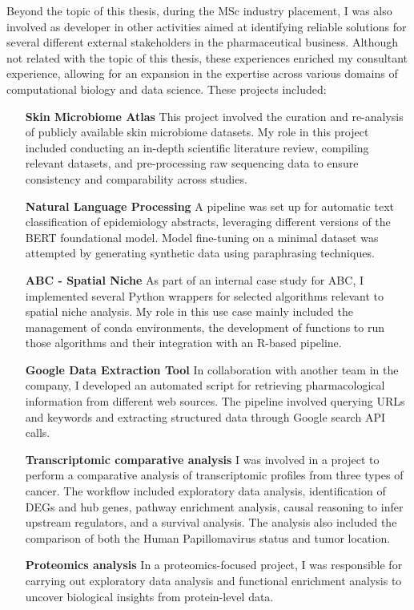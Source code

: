 Beyond the topic of this thesis, during the MSc industry placement, I was also involved as developer in other activities aimed at identifying reliable solutions for several different external stakeholders in the pharmaceutical business. Although not related with the topic of this thesis, these experiences enriched my consultant experience, allowing for an expansion in the expertise across various domains of computational biology and data science. 
These projects included:

\begin{enumerate}
\item[\textbf{Skin Microbiome Atlas}] This project involved the curation and re-analysis of publicly available skin microbiome datasets. My role in this project included conducting an in-depth scientific literature review, compiling relevant datasets, and pre-processing raw sequencing data to ensure consistency and comparability across studies. 
\item[\textbf{Natural Language Processing}] A pipeline was set up for automatic text classification of epidemiology abstracts, leveraging different versions of the BERT foundational model. Model fine-tuning on a minimal dataset was attempted by generating synthetic data using paraphrasing techniques. 
\item[\textbf{\gls{ABC} - Spatial Niche}] As part of an internal case study for \gls{ABC}, I implemented several Python wrappers for selected algorithms relevant to spatial niche analysis. My role in this use case mainly included the management of conda environments, the development of functions to run those algorithms and their integration with an \gls{R}-based pipeline.
\item[\textbf{Google Data Extraction Tool}] In collaboration with another team in the company, I developed an automated script for retrieving pharmacological information from different web sources. The pipeline involved querying URLs and keywords and extracting structured data through Google search API calls.
\item[\textbf{Transcriptomic comparative analysis}] I was involved in a project to perform a comparative analysis of transcriptomic profiles from three types of cancer. The workflow included exploratory data analysis, identification of \gls{DEGs} and hub genes, pathway enrichment analysis, causal reasoning to infer upstream regulators, and a survival analysis. The analysis also included the comparison of both the Human Papillomavirus status and tumor location.
\item[\textbf{Proteomics analysis}] In a proteomics-focused project, I was responsible for carrying out exploratory data analysis and functional enrichment analysis to uncover biological insights from protein-level data.

\end{enumerate}
